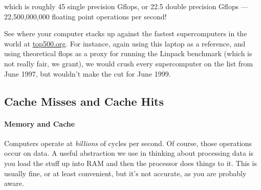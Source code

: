 which is roughly 45 single precision Gflops, or 22.5 double precision Gflops 
--- 22,500,000,000 floating point operations per second!

See where your computer stacks up against the fastest supercomputers in the 
world at \href{http://www.top500.org/}{top500.org}.  For instance, again using 
this laptop as a reference, and using theoretical flops as a proxy for running 
the Linpack benchmark (which is not really fair, we grant), we would crush 
every supercomputer on the list from June 1997, but wouldn't make the cut for 
June 1999.



\subsection{Cache Misses and Cache Hits}

\paragraph{Memory and Cache}

Computers operate at \emph{billions} of cycles per second.  Of course, those  
operations occur on data.  A useful abstraction we use in thinking about 
processing data is you load the stuff up into RAM and then the processor does 
things to it.  This is usually fine, or at least convenient, but it's not 
accurate, as you are probably aware.  

